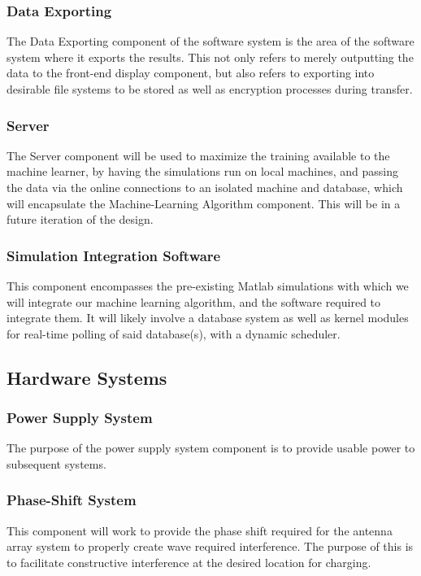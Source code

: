 \documentclass[12pt, titlepage]{article}
\begin{document}
\subsubsection{Data Exporting}
The Data Exporting component of the software system is the area of the software system where it exports the results. This not only refers to merely outputting the data to the front-end display component, but also refers to exporting into desirable file systems to be stored as well as encryption processes during transfer. 

\subsubsection{Server}
The Server component will be used to maximize the training available to the machine learner, by having the simulations run on local machines, and passing the data via the online connections to an isolated machine and database, which will encapsulate the Machine-Learning Algorithm component. This will be in a future iteration of the design.

\subsubsection{Simulation Integration Software}
This component encompasses the pre-existing Matlab simulations with which we will integrate our machine learning algorithm, and the software required to integrate them. It will likely involve a database system as well as kernel modules for real-time polling of said database(s), with a dynamic scheduler. 

\subsection{Hardware Systems}
\subsubsection{Power Supply System}
The purpose of the power supply system component is to provide usable power to subsequent systems. 

\subsubsection{Phase-Shift System}
This component will work to provide the phase shift required for the antenna array system to properly create wave required interference. The purpose of this is to facilitate constructive interference at the desired location for charging. 
\end{document}
